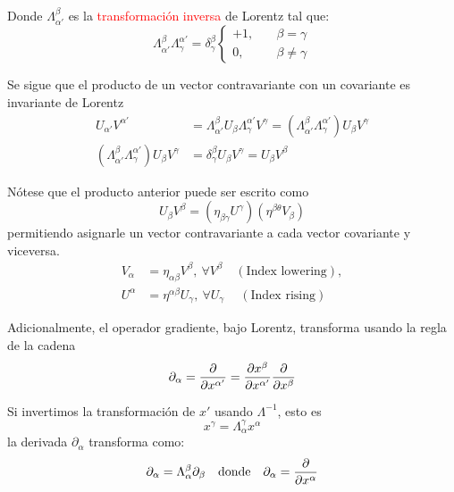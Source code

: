 \documentclass[../main]{subfiles}
\begin{document}
Donde $\Lambda_{\alpha'}^{\beta}$ es la \textcolor{red}{transformación inversa} de Lorentz tal que:
\begin{equation}
    \Lambda_{\alpha'}^{\beta} \Lambda^{\alpha'}_{\gamma}=\delta^{\beta}_{\gamma} 
    \left\{
    \begin{split}
        +1, & \quad \beta = \gamma \\
        0,  & \quad \beta \neq \gamma
    \end{split}
    \right.
\end{equation}

Se sigue que el producto de un vector contravariante con un covariante es invariante de Lorentz 
\begin{equation}
    \begin{split}
        U_{\alpha'}V^{\alpha'}&=\Lambda_{\alpha'}^{\beta} U_{\beta} \Lambda^{\alpha'}_{\gamma} V^{\gamma}=\left(\Lambda^{\beta}_{\alpha'} \Lambda^{\alpha'}_{\gamma}\right)U_{\beta} V^{\gamma} \\
        \left(\Lambda^{\beta}_{\alpha'} \Lambda^{\alpha'}_{\gamma}\right)U_{\beta} V^{\gamma}&=\delta^{\beta}_{\gamma} U_{\beta} V^{\gamma}=U_{\beta} V^{\beta}
    \end{split}
\end{equation} 

Nótese que el producto anterior puede ser escrito como 
\begin{equation}
    U_{\beta} V^{\beta}=\left(\eta_{\beta\gamma}U^{\gamma}\right)\left(\eta^{\beta\theta}V_{\beta}\right)
\end{equation}
permitiendo asignarle un vector contravariante a cada vector covariante y viceversa.
\begin{align}
    V_{\alpha}&=\eta_{\alpha\beta}V^{\beta}, \ \forall V^{\beta} \quad (\text{Index lowering}),\\
    U^{\alpha}&=\eta^{\alpha\beta}U_{\gamma}, \ \forall U_{\gamma} \quad \ (\text{Index rising})
\end{align}

Adicionalmente, el operador gradiente, bajo Lorentz, transforma usando la regla de la cadena 
\begin{equation}
    \partial_{\alpha}=\pdv{}{x^{\alpha'}}=\pdv{x^{\beta}}{x^{\alpha'}}\pdv{}{x^{\beta}}
\end{equation}

Si invertimos la transformación de $x'$ usando $\Lambda^{-1}$, esto es
\begin{equation}
    x^{\gamma}=\Lambda^{\gamma}_{\alpha} x^{\alpha}
\end{equation}
la derivada $\partial_{\alpha}$ transforma como:
\begin{equation}
    \partial_{\alpha}=\Lambda^{\beta}_{\alpha} \partial_{\beta} \quad \text{donde} \quad \partial_{\alpha}=\pdv{}{x^{\alpha}}
\end{equation}
\end{document}
